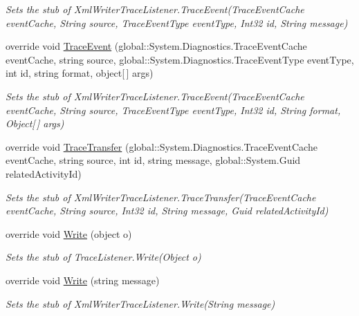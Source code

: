 \begin{DoxyCompactItemize}
\begin{DoxyCompactList}\small\item\em Sets the stub of Xml\-Writer\-Trace\-Listener.\-Trace\-Event(\-Trace\-Event\-Cache event\-Cache, String source, Trace\-Event\-Type event\-Type, Int32 id, String message)\end{DoxyCompactList}\item 
override void \hyperlink{class_system_1_1_diagnostics_1_1_fakes_1_1_stub_xml_writer_trace_listener_a370bb982049869e5dc5baac4917652f8}{Trace\-Event} (global\-::\-System.\-Diagnostics.\-Trace\-Event\-Cache event\-Cache, string source, global\-::\-System.\-Diagnostics.\-Trace\-Event\-Type event\-Type, int id, string format, object\mbox{[}$\,$\mbox{]} args)
\begin{DoxyCompactList}\small\item\em Sets the stub of Xml\-Writer\-Trace\-Listener.\-Trace\-Event(\-Trace\-Event\-Cache event\-Cache, String source, Trace\-Event\-Type event\-Type, Int32 id, String format, Object\mbox{[}$\,$\mbox{]} args)\end{DoxyCompactList}\item 
override void \hyperlink{class_system_1_1_diagnostics_1_1_fakes_1_1_stub_xml_writer_trace_listener_af9206d424a1efd045fd6aef0ce48b092}{Trace\-Transfer} (global\-::\-System.\-Diagnostics.\-Trace\-Event\-Cache event\-Cache, string source, int id, string message, global\-::\-System.\-Guid related\-Activity\-Id)
\begin{DoxyCompactList}\small\item\em Sets the stub of Xml\-Writer\-Trace\-Listener.\-Trace\-Transfer(\-Trace\-Event\-Cache event\-Cache, String source, Int32 id, String message, Guid related\-Activity\-Id)\end{DoxyCompactList}\item 
override void \hyperlink{class_system_1_1_diagnostics_1_1_fakes_1_1_stub_xml_writer_trace_listener_a230203ba0660c9c706fe893b4a1b6542}{Write} (object o)
\begin{DoxyCompactList}\small\item\em Sets the stub of Trace\-Listener.\-Write(\-Object o)\end{DoxyCompactList}\item 
override void \hyperlink{class_system_1_1_diagnostics_1_1_fakes_1_1_stub_xml_writer_trace_listener_ab39a5016e8f5c532a0e980e744f86647}{Write} (string message)
\begin{DoxyCompactList}\small\item\em Sets the stub of Xml\-Writer\-Trace\-Listener.\-Write(\-String message)\end{DoxyCompactList}\item 

\end{DoxyCompactItemize}
